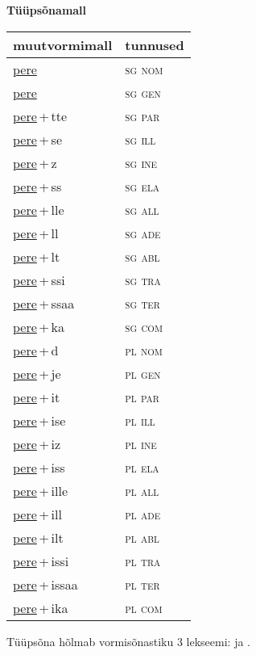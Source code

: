 
\vspace{1.8em}
\begin{minipage}{\textwidth}
\textbf{Tüüpsõnamall \,}\\

\begin{sideways}
\begin{tabular}{l l}
muutvormimall & tunnused \\
\hline
\underline{pere} & \textsc{ sg nom } \\
\underline{pere} & \textsc{ sg gen } \\
\underline{pere}\,+\,tte & \textsc{ sg par } \\
\underline{pere}\,+\,se & \textsc{ sg ill } \\
\underline{pere}\,+\,z & \textsc{ sg ine } \\
\underline{pere}\,+\,ss & \textsc{ sg ela } \\
\underline{pere}\,+\,lle & \textsc{ sg all } \\
\underline{pere}\,+\,ll & \textsc{ sg ade } \\
\underline{pere}\,+\,lt & \textsc{ sg abl } \\
\underline{pere}\,+\,ssi & \textsc{ sg tra } \\
\underline{pere}\,+\,ssaa & \textsc{ sg ter } \\
\underline{pere}\,+\,ka & \textsc{ sg com } \\
\underline{pere}\,+\,d & \textsc{ pl nom } \\
\underline{pere}\,+\,je & \textsc{ pl gen } \\
\underline{pere}\,+\,it & \textsc{ pl par } \\
\underline{pere}\,+\,ise & \textsc{ pl ill } \\
\underline{pere}\,+\,iz & \textsc{ pl ine } \\
\underline{pere}\,+\,iss & \textsc{ pl ela } \\
\underline{pere}\,+\,ille & \textsc{ pl all } \\
\underline{pere}\,+\,ill & \textsc{ pl ade } \\
\underline{pere}\,+\,ilt & \textsc{ pl abl } \\
\underline{pere}\,+\,issi & \textsc{ pl tra } \\
\underline{pere}\,+\,issaa & \textsc{ pl ter } \\
\underline{pere}\,+\,ika & \textsc{ pl com } \\
\end{tabular}
\end{sideways}
\label{tab:tüüpsõnamall-pere}

\end{minipage}

 
\vspace{1em}
\noindent Tüüpsõna hõlmab vormisõnastiku 3 lekseemi:  ja .

